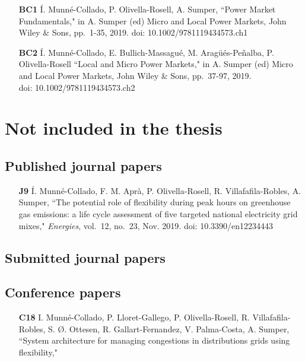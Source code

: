 \begin{itemize}
	
	\item [\textbf{BC1}] \'{I}. Munn\'{e}-Collado, P. Olivella-Rosell, A. Sumper, ``Power Market Fundamentals," in A. Sumper (ed) Micro and Local Power Markets, John Wiley \& Sons, pp.~1-35, 2019. doi: 10.1002/9781119434573.ch1
	
	\item [\textbf{BC2}] \'{I}. Munn\'{e}-Collado, E. Bullich-Massagu\'{e}, M. Arag\"{u}\'{e}s-Pe\~{n}alba, P. Olivella-Rosell ``Local and Micro Power Markets," in A. Sumper (ed) Micro and Local Power Markets, John Wiley \& Sons, pp.~37-97, 2019. \\doi: 10.1002/9781119434573.ch2

	
\end{itemize}

\section*{Not included in the thesis}

\subsection*{Published journal papers}

\begin{itemize}
	
	\item[\textbf{J9}] \'{I}. Munn\'{e}-Collado, F. M. Apr\`{a}, P. Olivella-Rosell, R. Villafafila-Robles, A. Sumper, ``The potential role of flexibility during peak hours on greenhouse gas emissions: a life cycle assessment of five targeted national electricity grid mixes," \textit{Energies}, vol.~12, no.~23, Nov. 2019. doi: 10.3390/en12234443
	
\end{itemize}

\subsection*{Submitted journal papers}


\subsection*{Conference papers}

\begin{itemize}

	\item[\textbf{C18}] I. Munn\'{e}-Collado, P. Lloret-Gallego, P. Olivella-Rosell, R. Villafafila-Robles, S. \O{}. Ottesen, R. Gallart-Fernandez, V. Palma-Costa, A. Sumper, ``System architecture for managing congestions in distributions grids using flexibility," 
	
\end{itemize}

